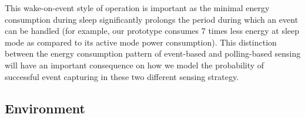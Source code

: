 %
This wake-on-event style of operation is important as the minimal energy consumption during sleep significantly prolongs the period during which an event can be handled (for example, our prototype consumes 7 times less energy at sleep mode as compared to its active mode power consumption).
This distinction between the energy consumption pattern of event-based and polling-based sensing will have an important consequence on how we model the probability of successful event capturing in these two different sensing strategy. 
%


\subsection{Environment}



